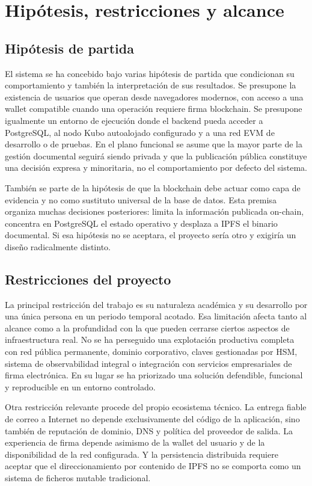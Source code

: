 \documentclass[11pt, a4paper]{article}
\begin{document}
\section{Hipótesis, restricciones y alcance}

\subsection{Hipótesis de partida}

El sistema se ha concebido bajo varias hipótesis de partida que condicionan su comportamiento y también la interpretación de sus resultados. Se presupone la existencia de usuarios que operan desde navegadores modernos, con acceso a una wallet compatible cuando una operación requiere firma blockchain. Se presupone igualmente un entorno de ejecución donde el backend pueda acceder a PostgreSQL, al nodo Kubo autoalojado configurado y a una red EVM de desarrollo o de pruebas. En el plano funcional se asume que la mayor parte de la gestión documental seguirá siendo privada y que la publicación pública constituye una decisión expresa y minoritaria, no el comportamiento por defecto del sistema.

También se parte de la hipótesis de que la blockchain debe actuar como capa de evidencia y no como sustituto universal de la base de datos. Esta premisa organiza muchas decisiones posteriores: limita la información publicada on-chain, concentra en PostgreSQL el estado operativo y desplaza a IPFS el binario documental. Si esa hipótesis no se aceptara, el proyecto sería otro y exigiría un diseño radicalmente distinto.

\subsection{Restricciones del proyecto}

La principal restricción del trabajo es su naturaleza académica y su desarrollo por una única persona en un periodo temporal acotado. Esa limitación afecta tanto al alcance como a la profundidad con la que pueden cerrarse ciertos aspectos de infraestructura real. No se ha perseguido una explotación productiva completa con red pública permanente, dominio corporativo, claves gestionadas por HSM, sistema de observabilidad integral o integración con servicios empresariales de firma electrónica. En su lugar se ha priorizado una solución defendible, funcional y reproducible en un entorno controlado.

Otra restricción relevante procede del propio ecosistema técnico. La entrega fiable de correo a Internet no depende exclusivamente del código de la aplicación, sino también de reputación de dominio, DNS y política del proveedor de salida. La experiencia de firma depende asimismo de la wallet del usuario y de la disponibilidad de la red configurada. Y la persistencia distribuida requiere aceptar que el direccionamiento por contenido de IPFS no se comporta como un sistema de ficheros mutable tradicional.
\end{document}
